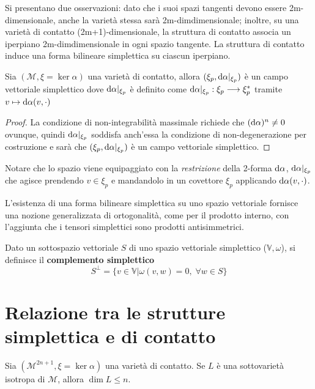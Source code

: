 Si presentano due osservazioni: dato che i suoi spazi tangenti devono essere 2m-dimensionale, anche la varietà stessa sarà 2m-dimdimensionale; inoltre, su una varietà di contatto (2m+1)-dimensionale, la struttura di contatto associa un iperpiano 2m-dimdimensionale in ogni spazio tangente.
La struttura di contatto induce una forma bilineare simplettica su ciascun iperpiano.

\begin{lemma}
    Sia $(\mathcal{M}, \xi = \ker \alpha)$ una varietà di contatto, allora $(\xi_p, \odif{\alpha}|_{\xi_p})$ è un campo vettoriale simplettico dove $\odif{\alpha}|_{\xi_p}$ è definito come $\odif{\alpha}|_{\xi_p} : \xi_p \longrightarrow \xi_p^*$ tramite $v \mapsto \odif{\alpha}(v, \cdot)$
\end{lemma}
\begin{proof}
    La condizione di non-integrabilità massimale richiede che $(\odif{\alpha})^n \neq 0$ ovunque, quindi $\odif{\alpha}|_{\xi_p}$ soddisfa anch'essa la condizione di non-degenerazione per costruzione e sarà che $(\xi_p, \odif{\alpha}|_{\xi_p})$ è un campo vettoriale simplettico.
\end{proof}

Notare che lo spazio viene equipaggiato con la \emph{restrizione} della 2-forma $\odif{\alpha}$, $\odif{\alpha}|_{\xi_p}$ che agisce prendendo $v \in \xi_p$ e mandandolo in un covettore $\xi_p$ applicando $\odif{\alpha}(v, \cdot)$.

L'esistenza di una forma bilineare simplettica su uno spazio vettoriale fornisce una nozione generalizzata di ortogonalità, come per il prodotto interno, con l'aggiunta che i tensori simplettici sono prodotti antisimmetrici.

\begin{definition}
    Dato un sottospazio vettoriale $S$ di uno spazio vettoriale simplettico ($\mathbb{V}, \omega$), si definisce il \textbf{complemento simplettico}
    \[
        S^\perp = \{ v \in \mathbb{V} | \omega(v, w) = 0, \; \forall w \in S\}
    \]
\end{definition}

\section{Relazione tra le strutture simplettica e di contatto}
\begin{proposition}
    Sia \(
    (\mathcal{M}^{2n+1}, \xi = \ker \alpha)
    \) una varietà di contatto. Se $L$ è una sottovarietà isotropa di $\mathcal{M}$, allora $\dim L \leq n$.
\end{proposition}

